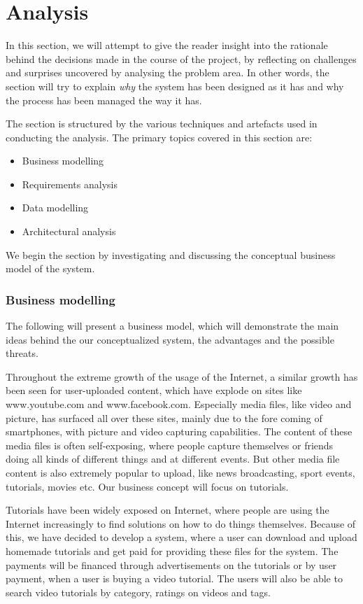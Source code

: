 \part{Analysis}
In this section, we will attempt to give the reader insight into the rationale behind the decisions made in the course of the project, by reflecting on challenges and surprises uncovered by analysing the problem area. In other words, the section will try to explain \textit{why} the system has been designed as it has and why the process has been managed the way it has.

The section is structured by the various techniques and artefacts used in conducting the analysis. The primary topics covered in this section are:
\begin{itemize}
\item Business modelling
\item Requirements analysis
\item Data modelling
\item Architectural analysis
\end{itemize}
We begin the section by investigating and discussing the conceptual business model of the system.

\section{Business modelling}
The following will present a business model, which will demonstrate the main ideas behind the our conceptualized system, the advantages and the possible threats.

Throughout the extreme growth of the usage of the Internet, a similar growth has been seen for user-uploaded content, which have explode on sites like www.youtube.com and www.facebook.com. Especially media files, like video and picture, has surfaced all over these sites, mainly due to the fore coming of smartphones, with picture and video capturing capabilities. The content of these media files is often self-exposing, where people capture themselves or friends doing all kinds of different things and at different events. But other media file content is also extremely popular to upload, like news broadcasting, sport events, tutorials, movies etc. Our business concept will focus on tutorials.

Tutorials have been widely exposed on Internet, where people are using the Internet increasingly to find solutions on how to do things themselves. Because of this, we have decided to develop a system, where a user can download and upload homemade tutorials and get paid for providing these files for the system. The payments will be financed through advertisements on the tutorials or by user payment, when a user is buying a video tutorial. The users will also be able to search video tutorials by category, ratings on videos and tags.

